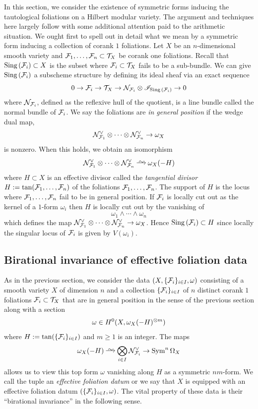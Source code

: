 \documentclass[main.tex]{subfiles}
\begin{document}
{In this section, we consider the existence of symmetric forms inducing the tautological foliations on a Hilbert modular variety. The argument and techniques here largely follow \cite{rousseau:curves_hilbert_modular} with some additional attention paid to the arithmetic situation. We ought first to spell out in detail what we mean by a symmetric form inducing a collection of corank $1$ foliations. Let $X$ be an $n$-dimensional smooth variety and $\mathcal{F}_1, \dots, \mathcal{F}_n \subset \mathcal{T}_X$ be corank one foliations. Recall that $\operatorname{\mathrm{Sing}}{(\mathcal{F}_i)} \subset X$ is the subset where $\mathcal{F}_i \subset \mathcal{T}_X$ fails to be a sub-bundle. We can give $\operatorname{\mathrm{Sing}}{(\mathcal{F}_i)}$ a subscheme structure by defining its ideal sheaf via an exact sequence
\[ 0 \to \mathcal{F}_i \to \mathcal{T}_X \to \mathcal{N}_{\mathcal{F}_i} \otimes \mathscr{I}_{\operatorname{\mathrm{Sing}}{(\mathcal{F}_i)}} \to 0 \]
where $\mathcal{N}_{\mathcal{F}_i}$, defined as the reflexive hull of the quotient, is a line bundle called the normal bundle of $\mathcal{F}_i$. 
We say the foliations are \textit{in general position} if the wedge dual map,
\[ \mathcal{N}_{\mathcal{F}_1}^{\vee} \otimes \cdots \otimes \mathcal{N}_{\mathcal{F}_n}^{\vee} \to \omega_X \]
is nonzero. When this holds, we obtain an isomorphism
\[ \cN_{\F_1}^{\vee} \ot \cdots \ot \cN_{\F_n}^{\vee} \iso \omega_X(-H) \]
where $H \subset X$ is an effective divisor called the \textit{tangential divisor} $H := \tan(\mathcal{F}_1, \dots, \mathcal{F}_n)$ of the foliations $\mathcal{F}_1, \dots, \mathcal{F}_n$. The support of $H$ is the locus where $\mathcal{F}_1, \dots, \mathcal{F}_n$ fail to be in general position. If $\mathcal{F}_i$ is locally cut out as the kernel of a $1$-form $\omega_i$ then $H$ is locally cut out by the vanishing of 
\[ \omega_1 \wedge \cdots \wedge \omega_n \]
which defines the map $\mathcal{N}_{\mathcal{F}_1}^{\vee} \otimes \cdots \otimes \mathcal{N}_{\mathcal{F}_n}^{\vee} \to \omega_X$. Hence $\operatorname{\mathrm{Sing}}{(\mathcal{F}_i)} \subset H$ since locally the singular locus of $\mathcal{F}_i$ is given by $V(\omega_i)$. 

\subsection{Birational invariance of effective foliation data} \label{section:birational_invariance_of_effective_foliation_data}

As in the previous section, we consider the data $(X, \{ \mathcal{F}_i \}_{i \in I}, \omega)$ consisting of a smooth variety $X$ of dimension $n$ and a collection $\{ \mathcal{F}_i \}_{i \in I}$ of $n$ distinct corank $1$ foliations $\mathcal{F}_i \subset \mathcal{T}_X$ that are in general position in the sense of the previous section along with a section 
\[ \omega \in H^0(X, \omega_X(-H)^{\otimes m}) \]
where $H := \tan(\{ \mathcal{F}_i \}_{i \in I})$ and $m \ge 1$ is an integer. The maps 
\[ \omega_X(-H) \iso \bigotimes_{i \in I} \cN_{\F_i}^{\vee} \to \Sym^{n} \Omega_X \]
allows us to view this top form $\omega$ vanishing along $H$ as a symmetric $nm$-form. We call the tuple an \textit{effective foliation datum} or we say that $X$ is equipped with an effective foliation datum $(\{ \mathcal{F}_i \}_{i \in I}, \omega)$. The vital property of these data is their ``birational invariance'' in the following sense.

}
\end{document}

